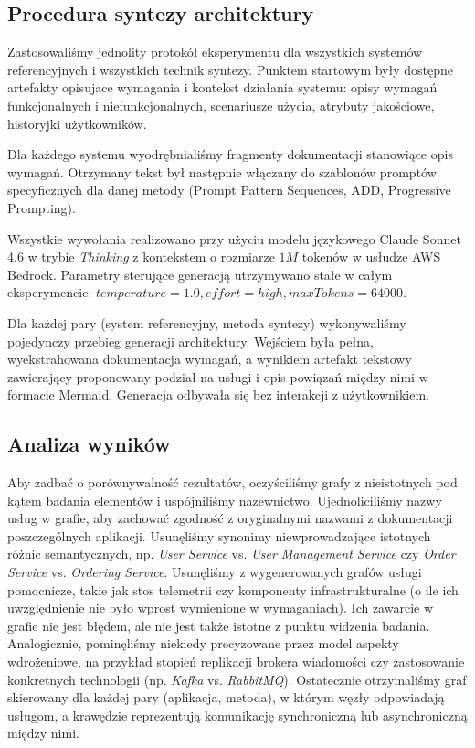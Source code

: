\subsection{Procedura syntezy architektury}

Zastosowaliśmy jednolity protokół eksperymentu dla wszystkich systemów referencyjnych i wszystkich technik syntezy. Punktem startowym były dostępne artefakty opisujace wymagania i kontekst działania systemu: opisy wymagań funkcjonalnych i niefunkcjonalnych, scenariusze użycia, atrybuty jakościowe, historyjki użytkowników. 

Dla każdego systemu wyodrębnialiśmy fragmenty dokumentacji stanowiące opis wymagań. Otrzymany tekst był następnie włączany do szablonów promptów specyficznych dla danej metody (Prompt Pattern Sequences, ADD, Progressive Prompting).

Wszystkie wywołania realizowano przy użyciu modelu językowego Claude Sonnet 4.6 w trybie \emph{Thinking} z kontekstem o rozmiarze $1M$ tokenów w usłudze AWS Bedrock. Parametry sterujące generacją utrzymywano stałe w całym eksperymencie: $temperature=1.0, effort=high, maxTokens=64000$.

Dla każdej pary (system referencyjny, metoda syntezy) wykonywaliśmy pojedynczy przebieg generacji architektury. Wejściem była pełna, wyekstrahowana dokumentacja wymagań, a wynikiem artefakt tekstowy zawierający proponowany podział na usługi i opis powiązań między nimi w formacie Mermaid. Generacja odbywała się bez interakcji z użytkownikiem.

\subsection{Analiza wyników}

Aby zadbać o porównywalność rezultatów, oczyściliśmy grafy z nieistotnych pod kątem badania elementów i uspójniliśmy nazewnictwo. Ujednoliciliśmy nazwy usług w grafie, aby zachować zgodność z oryginalnymi nazwami z dokumentacji poszczególnych aplikacji. Usunęliśmy synonimy niewprowadzające istotnych różnic semantycznych, np. \emph{User Service} vs. \emph{User Management Service} czy \emph{Order Service} vs. \emph{Ordering Service}. Usunęliśmy z wygenerowanych grafów usługi pomocnicze, takie jak stos telemetrii czy komponenty infrastrukturalne (o ile ich uwzględnienie nie było wprost wymienione w wymaganiach). Ich zawarcie w grafie nie jest błędem, ale nie jest także istotne z punktu widzenia badania. Analogicznie, pominęliśmy niekiedy precyzowane przez model aspekty wdrożeniowe, na przykład stopień replikacji brokera wiadomości czy zastosowanie konkretnych technologii (np. \emph{Kafka} vs. \emph{RabbitMQ}). Ostatecznie otrzymaliśmy graf skierowany dla każdej pary (aplikacja, metoda), w którym węzły odpowiadają usługom, a krawędzie reprezentują komunikację synchroniczną lub asynchroniczną między nimi.


